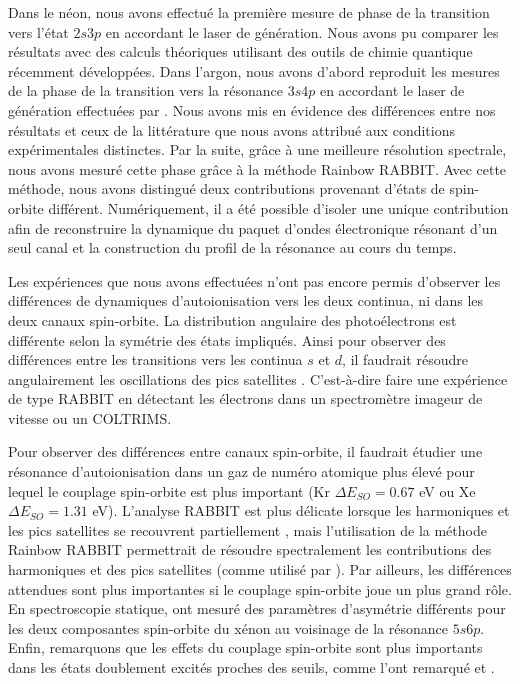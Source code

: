 Dans le néon, nous avons effectué la première mesure de phase de la transition vers l'état $2s3p$ en accordant le laser de génération. Nous avons pu comparer les résultats avec des calculs théoriques utilisant des outils de chimie quantique récemment développées. Dans l'argon, nous avons d'abord reproduit les mesures de la phase de la transition vers la résonance $3s4p$ en accordant le laser de génération effectuées par . Nous avons mis en évidence des différences entre nos résultats et ceux de la littérature que nous avons attribué aux conditions expérimentales distinctes. Par la suite, grâce à une meilleure résolution spectrale, nous avons mesuré cette phase grâce à la méthode Rainbow RABBIT. Avec cette méthode, nous avons distingué deux contributions provenant d'états de spin-orbite différent. Numériquement, il a été possible d'isoler une unique contribution afin de reconstruire la dynamique du paquet d'ondes électronique résonant d'un seul canal et la construction du profil de la résonance au cours du temps.

Les expériences que nous avons effectuées n'ont pas encore permis d'observer les différences de dynamiques d'autoionisation vers les deux continua, ni dans les deux canaux spin-orbite. La distribution angulaire des photoélectrons est différente selon la symétrie des états impliqués. Ainsi pour observer des différences entre les transitions vers les continua $s$ et $d$, il faudrait résoudre angulairement les oscillations des pics satellites . C'est-à-dire faire une expérience de type RABBIT en détectant les électrons dans un spectromètre imageur de vitesse  ou un COLTRIMS.

Pour observer des différences entre canaux spin-orbite, il faudrait étudier une résonance d'autoionisation dans un gaz de numéro atomique plus élevé pour lequel le couplage spin-orbite est plus important (Kr $\Delta E_{SO} = 0.67$ eV ou Xe $\Delta E_{SO} = 1.31$ eV). L'analyse RABBIT est plus délicate lorsque les harmoniques et les pics satellites se recouvrent partiellement , mais l'utilisation de la méthode Rainbow RABBIT permettrait de résoudre spectralement les contributions des harmoniques et des pics satellites (comme utilisé par ). Par ailleurs, les différences attendues sont plus importantes si le couplage spin-orbite joue un plus grand rôle. En spectroscopie statique,  ont mesuré des paramètres d'asymétrie différents pour les deux composantes spin-orbite du xénon au voisinage de la résonance $5s6p$. Enfin, remarquons que les effets du couplage spin-orbite sont plus importants dans les états doublement excités proches des seuils, comme l'ont remarqué  et .


